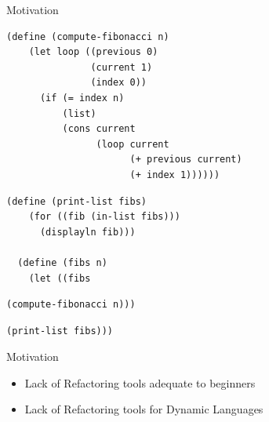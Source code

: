 \documentclass[xcolor=dvipsnames, 14pt]{beamer}
\begin{document}
\begin{frame}[fragile]{Motivation}

\begin{Verbatim}[frame=single, rulecolor=\color{red},fontsize=\footnotesize]
  (define (compute-fibonacci n)
    (let loop ((previous 0)
               (current 1)
               (index 0))
      (if (= index n)
          (list)
          (cons current
                (loop current
                      (+ previous current)
                      (+ index 1))))))
\end{Verbatim}
\begin{Verbatim}[fontsize=\scriptsize]
  (define (print-list fibs)
    (for ((fib (in-list fibs)))
      (displayln fib)))

  (define (fibs n)
    (let ((fibs
\end{Verbatim}
\begin{Verbatim}[frame=single, rulecolor=\color{red},fontsize=\footnotesize]
           (compute-fibonacci n)))
\end{Verbatim}
\begin{Verbatim}[fontsize=\scriptsize]
      (print-list fibs)))
\end{Verbatim}
\end{frame}
\begin{frame}{Motivation}
  \begin{itemize}
  \setlength\itemsep{2em}
  \item {
    Lack of Refactoring tools adequate to beginners
  }
  \item {
    Lack of Refactoring tools for Dynamic Languages
  }

  \end{itemize}
\end{frame}
\end{document}
